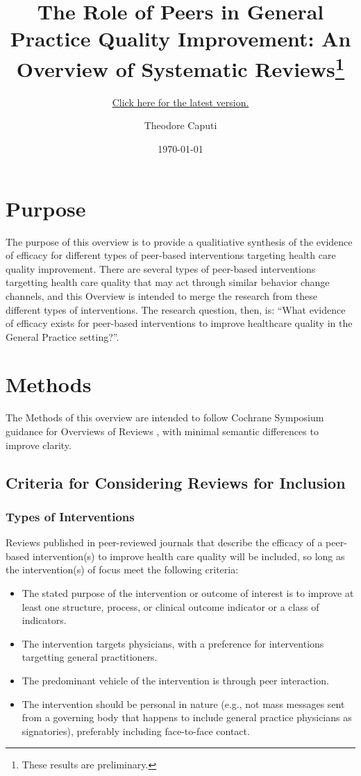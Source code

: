 \documentclass[12pt]{article}
\subtitle{\href{https://www.TheodoreCaputi.com/files/peerQuality.pdf}{Click here for the latest version.}}
\title{The Role of Peers in General Practice Quality Improvement: An Overview of Systematic Reviews\footnote{These results are preliminary.}}
\author{Theodore Caputi}
\date{\today}
\begin{document}
\maketitle


\section{Purpose}

The purpose of this overview is to provide a qualitiative synthesis of the evidence of efficacy for different types of peer-based interventions targeting health care quality improvement. There are several types of peer-based interventions targetting health care quality that may act through similar behavior change channels, and this Overview is intended to merge the research from these different types of interventions. The research question, then, is: ``What evidence of efficacy exists for peer-based interventions to improve healthcare quality in the General Practice setting?''.


\section{Methods}

The Methods of this overview are intended to follow Cochrane Symposium guidance for Overviews of Reviews \citep{huntIntroductionOverviewsReviews2018}, with minimal semantic differences to improve clarity.

\subsection{Criteria for Considering Reviews for Inclusion}
\label{sec:Criteria}


\subsubsection{Types of Interventions}
Reviews published in peer-reviewed journals that describe the efficacy of a peer-based intervention(s) to improve health care quality will be included, so long as the intervention(s) of focus meet the following criteria:

\begin{itemize}
  \item The stated purpose of the intervention or outcome of interest is to improve at least one structure, process, or clinical outcome indicator or a class of indicators.
  \item The intervention targets physicians, with a preference for interventions targetting general practitioners.
  \item The predominant vehicle of the intervention is through peer interaction.
  \item The intervention should be personal in nature (e.g., not mass messages sent from a governing body that happens to include general practice physicians as signatories), preferably including face-to-face contact.
\end{itemize}
\end{document}
